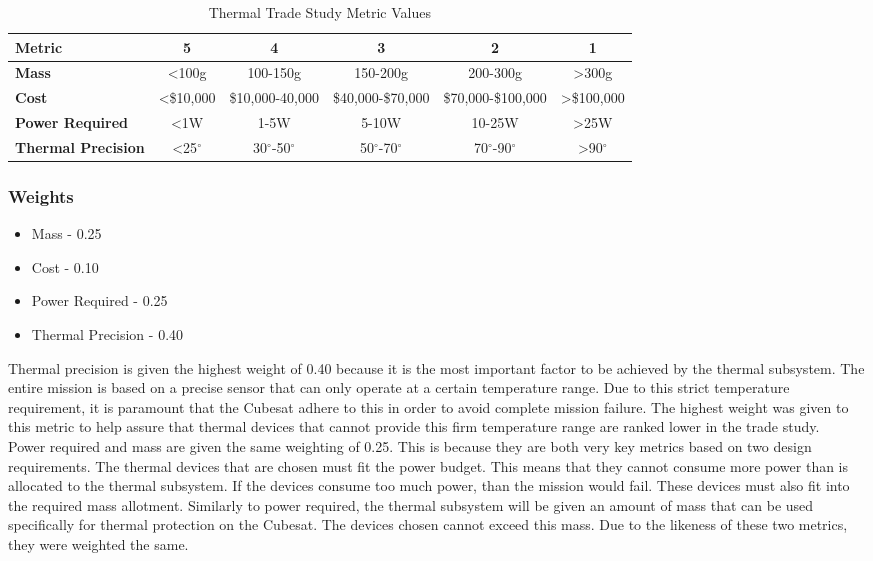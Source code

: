 \begin{table}[H]
\centering
\begin{tabular}{|l|c|c|c|c|c|} 
\hline
    \textbf{Metric} & \textbf{5} & \textbf{4} & \textbf{3} & \textbf{2} & \textbf{1}
    \\
\hline
    \textbf{Mass} & <100g & 100-150g & 150-200g & 200-300g & >300g 
    \\
\hline
    \textbf{Cost} & <\$10,000 & \$10,000-40,000 & \$40,000-\$70,000 & \$70,000-\$100,000 & >\$100,000
    \\
\hline
    \textbf{Power Required} & <1W & 1-5W & 5-10W & 10-25W & >25W 
    \\
\hline
    \textbf{Thermal Precision} & <25$^{\circ}$  & 30$^{\circ}$-50$^{\circ}$ & 50$^{\circ}$-70$^{\circ}$ & 70$^{\circ}$-90$^{\circ}$ & >90$^{\circ}$ 
    \\
\hline
\end{tabular}
\caption{Thermal Trade Study Metric Values}
\label{tbl:Thermal_Metric_Scores}
\end{table}

\subsubsection{Weights}

\begin{itemize}
    \item Mass - 0.25
    \item Cost - 0.10
    \item Power Required - 0.25
    \item Thermal Precision - 0.40
\end{itemize}

Thermal precision is given the highest weight of 0.40 because it is the most important factor to be achieved by the thermal subsystem.  The entire mission is based on a precise sensor that can only operate at a certain temperature range. Due to this strict temperature requirement, it is paramount that the Cubesat adhere to this in order to avoid complete mission failure. The highest weight was given to this metric to help assure that thermal devices that cannot provide this firm temperature range are ranked lower in the trade study.\\

Power required and mass are given the same weighting of 0.25.  This is because they are both very key metrics based on two design requirements.  The thermal devices that are chosen must fit the power budget.  This means that they cannot consume more power than is allocated to the thermal subsystem.  If the devices consume too much power, than the mission would fail.  These devices must also fit into the required mass allotment.  Similarly to power required, the thermal subsystem will be given an amount of mass that can be used specifically for thermal protection on the Cubesat.  The devices chosen cannot exceed this mass.  Due to the likeness of these two metrics, they were weighted the same.\\


